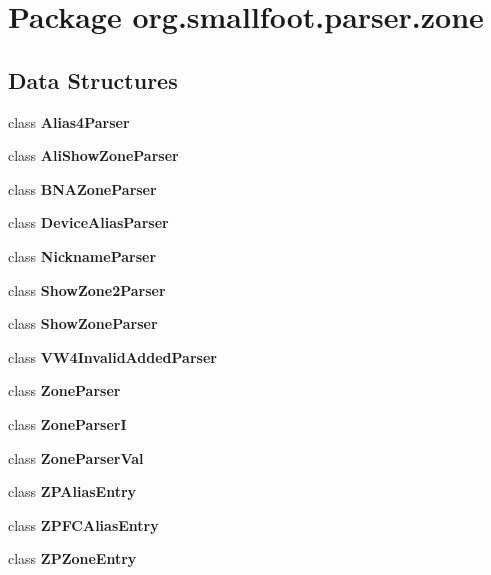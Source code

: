 \section{Package org.\+smallfoot.\+parser.\+zone}
\label{namespaceorg_1_1smallfoot_1_1parser_1_1zone}
\subsection*{Data Structures}
\begin{DoxyCompactItemize}
\item 
class {\bf Alias4\+Parser}
\item 
class {\bf Ali\+Show\+Zone\+Parser}
\item 
class {\bf B\+N\+A\+Zone\+Parser}
\item 
class {\bf Device\+Alias\+Parser}
\item 
class {\bf Nickname\+Parser}
\item 
class {\bf Show\+Zone2\+Parser}
\item 
class {\bf Show\+Zone\+Parser}
\item 
class {\bf V\+W4\+Invalid\+Added\+Parser}
\item 
class {\bf Zone\+Parser}
\item 
class {\bf Zone\+Parser\+I}
\item 
class {\bf Zone\+Parser\+Val}
\item 
class {\bf Z\+P\+Alias\+Entry}
\item 
class {\bf Z\+P\+F\+C\+Alias\+Entry}
\item 
class {\bfseries Z\+P\+Zone\+Entry}
\end{DoxyCompactItemize}
